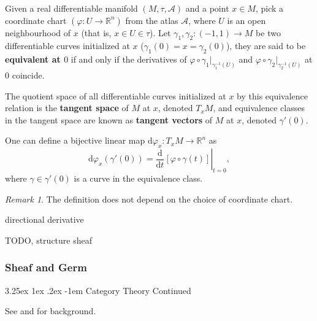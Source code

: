 \documentclass[12pt, letterpaper]{article}
\makeatletter
\newcommand{\re}{\mathbb{R}}
\newcommand{\dd}{\mathrm{d}}
\newcommand{\red}[1]{{\color{red} #1}}
\renewcommand\paragraph{\@startsection{paragraph}{4}{\z@}%
	{3.25ex \@plus1ex \@minus.2ex}%
	{-1em}%
	{\normalfont\normalsize\bfseries}}
\theoremstyle{definition}
\theoremstyle{remark}
\newtheorem*{rem*}{Remark}
\theoremstyle{definition}
\theoremstyle{plain}
\numberwithin{equation}{section}
\makeatother
\begin{document}
	\begin{def*}
		Given a real differentiable manifold $(M,\tau,\mathcal{A})$ and a point $x\in M$,
		pick a coordinate chart $(\varphi \colon U \to \re^{n})$ from the atlas $\mathcal{A}$, where $U$ is an open neighbourhood
		of $x$ (that is, $x\in U\in\tau$). Let $\gamma_1,\gamma_2\colon (-1,1)\to M$ be 
		two differentiable curves initialized at $x$ ($\gamma_1(0)=x=\gamma_2(0)$), they are said to be \textbf{equivalent at $ 0$}
		if and only if the derivatives of $ \varphi \circ \gamma _{1}|_{\gamma_1^{-1}(U)}$
		and $ \varphi \circ \gamma _{2}|_{\gamma_2^{-1}(U)}$ 
		at $ 0$ coincide.
		
		The quotient space of all differentiable curves initialized at $x$ by this equivalence relation 
		is the \textbf{tangent space} of $M$ at $x$, denoted $T_xM$, and equivalence classes in the tangent space
		are known as \textbf{tangent vectors} of $M$ at $x$, denoted $\gamma'(0)$.
		
		One can define a bijective linear map $\dd\varphi_x\colon T_xM\to \re^n$ as
		\[\dd\varphi_x(\gamma'(0))=\left.\frac{\dd}{\dd t}[\varphi\circ\gamma(t) ]\right|_{t=0} ,\]
		where $\gamma\in\gamma'(0)$ is a curve in the equivalence class.
	\end{def*}
	\begin{rem*}
		The definition does not depend on the choice of coordinate chart.
	\end{rem*}

	\begin{def*}
		\red{directional derivative}
	\end{def*}

	\red{TODO, structure sheaf}
	
	\subsubsection{Sheaf and Germ}
	\paragraph{Category Theory Continued}
		
	See  and  for background.
	
\end{document}

